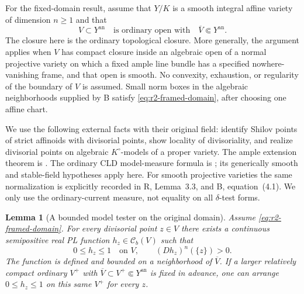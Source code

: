 \documentclass[11pt,a4paper]{article}
\numberwithin{equation}{section}
\newtheorem{lemma}[theorem]{Lemma}
\theoremstyle{definition}
\theoremstyle{remark}
\newcommand{\Cb}{\mathcal C_b}
\begin{document}
For the fixed-domain result, assume that $Y/K$ is a smooth integral
affine variety of dimension $n\geq1$ and that
\[
 V\subset Y^{\mathrm{an}}
 \quad\text{is ordinary open with}\quad
 \overline V\Subset Y^{\mathrm{an}}.
 \tag{G}\label{eq:r2-framed-domain}
\]
The closure here is the ordinary topological closure. More generally,
the argument applies when $V$ has compact closure inside an algebraic
open of a normal projective variety on which a fixed ample line bundle
has a specified nowhere-vanishing frame, and that open is smooth.
No convexity, exhaustion, or regularity of the boundary of $V$ is
assumed. Small norm boxes in the algebraic neighborhoods supplied by
\textup{B} satisfy \eqref{eq:r2-framed-domain}, after choosing one
affine chart.

We use the following external facts with their original field:
\cite[Proposition~A.3, p.~365; Corollary~A.6, p.~367;
Proposition~A.9, p.~368]{GM19} identify Shilov points of strict
affinoids with divisorial points, show locality of divisoriality, and
realize divisorial points on algebraic $K^\circ$-models of a proper
variety. The ample extension theorem is
\cite[Proposition~4.11, p.~353]{GM19}. The ordinary CLD model-measure
formula is \cite[Theorem~6.9.3 and Proposition~6.9.7]{CLD12}; its
generically smooth and stable-field hypotheses apply here. For smooth
projective varieties the same normalization is explicitly recorded in
\textup{R}, Lemma~3.3, and \textup{B}, equation~(4.1). We only use the
ordinary-current measure, not equality on all $\delta$-test forms.

\begin{lemma}[A bounded model tester on the original domain]
\label{lem:r2-atomic-tester}
Assume \eqref{eq:r2-framed-domain}. For every divisorial point
$z\in V$ there exists a continuous semipositive real PL function
$h_z\in\Cb(V)$ such that
\[
 0\leq h_z\leq1\quad\text{on }V,
 \qquad (Dh_z)^n(\{z\})>0.
\]
The function is defined and bounded on a neighborhood of $\overline V$.
If a larger relatively compact ordinary $V^+$ with
$\overline V\subset V^+\Subset Y^{\mathrm{an}}$ is fixed in advance,
one can arrange $0\leq h_z\leq1$ on this same $V^+$ for every $z$.
\end{lemma}
\end{document}
